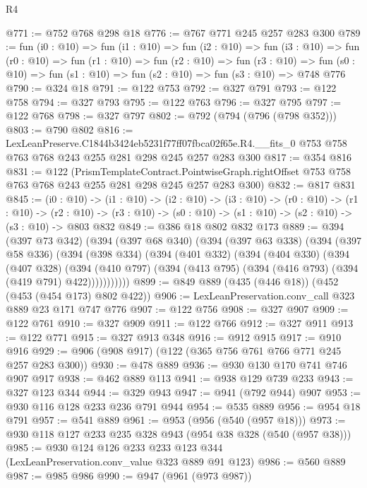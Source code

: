 \begin{lexlean}{R4}
\begin{coremodule}
@771 := @752 @768 @298 @18
@776 := @767 @771 @245 @257 @283 @300
@789 := fun (i0 : @10) =>
  fun (i1 : @10) =>
  fun (i2 : @10) =>
  fun (i3 : @10) =>
  fun (r0 : @10) =>
  fun (r1 : @10) =>
  fun (r2 : @10) =>
  fun (r3 : @10) =>
  fun (s0 : @10) => fun (s1 : @10) => fun (s2 : @10) => fun (s3 : @10) => @748 @776
@790 := @324 @18
@791 := @122 @753
@792 := @327 @791
@793 := @122 @758
@794 := @327 @793
@795 := @122 @763
@796 := @327 @795
@797 := @122 @768
@798 := @327 @797
@802 := @792 (@794 (@796 (@798 @352)))
@803 := @790 @802
@816 := LexLeanPreserve.C1844b3424eb5231f77ff07fbca02f65e.R4.__fits_0
    @753
    @758
    @763
    @768
    @243
    @255
    @281
    @298
    @245
    @257
    @283
    @300
@817 := @354 @816
@831 := @122
    (PrismTemplateContract.PointwiseGraph.rightOffset
      @753
      @758
      @763
      @768
      @243
      @255
      @281
      @298
      @245
      @257
      @283
      @300)
@832 := @817 @831
@845 := (i0 : @10) ->
  (i1 : @10) ->
  (i2 : @10) ->
  (i3 : @10) ->
  (r0 : @10) ->
  (r1 : @10) ->
  (r2 : @10) -> (r3 : @10) -> (s0 : @10) -> (s1 : @10) -> (s2 : @10) -> (s3 : @10) -> @803 @832
@849 := @386 @18 @802 @832 @173
@889 := @394
    (@397 @73 @342)
    (@394
      (@397 @68 @340)
      (@394
        (@397 @63 @338)
        (@394
          (@397 @58 @336)
          (@394
            (@398 @334)
            (@394
              (@401 @332)
              (@394
                (@404 @330)
                (@394
                  (@407 @328)
                  (@394
                    (@410 @797)
                    (@394 (@413 @795) (@394 (@416 @793) (@394 (@419 @791) @422)))))))))))
@899 := @849 @889 (@435 (@446 @18)) (@452 (@453 (@454 @173) @802 @422))
@906 := LexLeanPreservation.conv_call @323 @889 @23 @171 @747 @776
@907 := @122 @756
@908 := @327 @907
@909 := @122 @761
@910 := @327 @909
@911 := @122 @766
@912 := @327 @911
@913 := @122 @771
@915 := @327 @913 @348
@916 := @912 @915
@917 := @910 @916
@929 := @906 (@908 @917) (@122 (@365 @756 @761 @766 @771 @245 @257 @283 @300))
@930 := @478 @889
@936 := @930 @130 @170 @741 @746 @907 @917
@938 := @462 @889 @113
@941 := @938 @129 @739 @233
@943 := @327 @123 @344
@944 := @329 @943
@947 := @941 (@792 @944) @907
@953 := @930 @116 @128 @233 @236 @791 @944
@954 := @535 @889
@956 := @954 @18 @791
@957 := @541 @889
@961 := @953 (@956 (@540 (@957 @18)))
@973 := @930 @118 @127 @233 @235 @328 @943 (@954 @38 @328 (@540 (@957 @38)))
@985 := @930 @124 @126 @233 @233 @123 @344 (LexLeanPreservation.conv_value @323 @889 @91 @123)
@986 := @560 @889
@987 := @985 @986
@990 := @947 (@961 (@973 @987))

\end{coremodule}
\end{lexlean}
